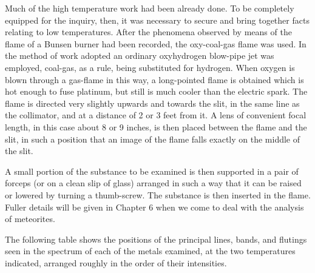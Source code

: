 \documentclass[a4paper, 12pt, oneside, polutonikogreek, english]{article}
\begin{document}
Much of the high temperature work had been already done. To be completely equipped for the inquiry, then, it was necessary to secure and bring together facts relating to low temperatures. After the phenomena observed by means of the flame of a Bunsen burner had been recorded, the oxy-coal-gas flame was used. In the method of work adopted an ordinary oxyhydrogen blow-pipe jet was employed, coal-gas, as a rule, being substituted for hydrogen. When oxygen is blown through a gas-flame in this way, a long-pointed flame is obtained which is hot enough to fuse platinum, but still is much cooler than the electric spark. The flame is directed very slightly upwards and towards the slit, in the same line as the collimator, and at a distance of 2 or 3 feet from it. A lens of convenient focal length, in this case about 8 or 9 inches, is then placed between the flame and the slit, in such a position that an image of the flame falls exactly on the middle of the slit.

A small portion of the substance to be examined is then supported in a pair of forceps (or on a clean slip of glass) arranged in such a way that it can be raised or lowered by turning a thumb-screw. The substance is then inserted in the flame. Fuller details will be given in Chapter 6 when we come to deal with the analysis of meteorites.

The following table shows the positions of the principal lines, bands, and flutings seen in the spectrum of each of the metals examined, at the two temperatures indicated, arranged roughly in the order of their intensities.
\end{document}

